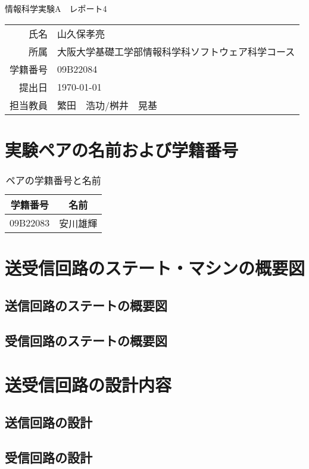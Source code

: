 \documentclass[dvipdfmx]{jarticle}
\begin{document}
\begin{titlepage}
    \begin{center}
        {\huge 情報科学実験A　レポート4}
        \vspace{180pt}\\
        \begin{tabular}{rl}
            氏名 & 山久保孝亮\\
            所属 & 大阪大学基礎工学部情報科学科ソフトウェア科学コース\\
            学籍番号 & 09B22084\\
            提出日 & \today\\
            担当教員 & 繁田　浩功/桝井　晃基
        \end{tabular}
    \end{center}
\end{titlepage}
\section{実験ペアの名前および学籍番号}
\begin{table}[h]
    \centering
    \begin{tabular}{|c|c|}
        \hline
        学籍番号 & 名前\\\hline\hline
        09B22083 & 安川雄輝\\\hline
    \end{tabular}
    \caption{ペアの学籍番号と名前}
\end{table}
\section{送受信回路のステート・マシンの概要図}
\subsection{送信回路のステートの概要図}
\subsection{受信回路のステートの概要図}
\section{送受信回路の設計内容}
\subsection{送信回路の設計}
\subsection{受信回路の設計}
\end{document}
